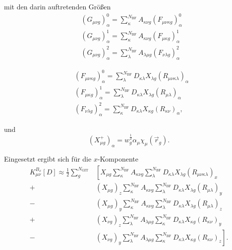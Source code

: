 	mit den darin auftretenden Größen
	\begin{equation}
	\begin{aligned}
	&(G_{\mu\nu g})_\alpha^0=\sum_\kappa^{N_{\textrm{BF}}}A_{\kappa\nu g}(F_{\mu\nu\kappa g})_\alpha^0\\
	&(G_{\mu\nu g})_\alpha^1=\sum_\kappa^{N_{\textrm{BF}}}A_{\kappa\nu g}(F_{\mu\kappa g})_\alpha^1\\
	&(G_{\mu\nu g})_\alpha^2=\sum_\lambda^{N_{\textrm{BF}}}A_{\lambda\mu g}(F_{\nu\lambda g})_\alpha^2
	\end{aligned}
	\end{equation}	
	
	\begin{equation}
	\begin{aligned}
	&(F_{\mu\nu\kappa g})_\alpha^0=\sum_\lambda^{N_{\textrm{BF}}}D_{\kappa\lambda}X_{\lambda g}(R_{\mu\nu\kappa\lambda})_\alpha\\
	&(F_{\mu\kappa g})_\alpha^1=\sum_\lambda^{N_{\textrm{BF}}}D_{\kappa\lambda}X_{\lambda g}(R_{\mu\lambda})_\alpha\\
	&(F_{\nu\lambda g})_\alpha^2=\sum_\kappa^{N_{\textrm{BF}}}D_{\kappa\lambda}X_{\kappa g}(R_{\kappa\nu})_\alpha,
	\end{aligned}
	\end{equation}
	
	und
	\begin{equation}
	\left(X_{\mu g}^+\right)_\alpha=w_g^{\frac{1}{2}}\alpha_\mu\chi_\mu(\vec{r}_g).
	\end{equation}
	
	Eingesetzt ergibt sich für die $x$-Komponente
	\begin{equation}
	\begin{aligned}
	K_{\mu\nu}^{B_x}[D]\approx\frac{1}{2}\sum_{g}^{N_{\textrm{GIT}}}&\left[X_{\mu g}\sum_\kappa^{N_{\textrm{BF}}}A_{\kappa\nu g}\sum_\lambda^{N_{\textrm{BF}}}D_{\kappa\lambda}X_{\lambda g}(R_{\mu\nu\kappa\lambda})_x\right.\\
	+&\left(X_{\mu g}\right)_z\sum_\kappa^{N_{\textrm{BF}}}A_{\kappa\nu g}\sum_\lambda^{N_{\textrm{BF}}}D_{\kappa\lambda}X_{\lambda g}(R_{\mu\lambda})_y\\
	-&\left(X_{\mu g}\right)_y\sum_\kappa^{N_{\textrm{BF}}}A_{\kappa\nu g}\sum_\lambda^{N_{\textrm{BF}}}D_{\kappa\lambda}X_{\lambda g}(R_{\mu\lambda})_z\\
	+&\left(X_{\nu g}\right)_z\sum_\lambda^{N_{\textrm{BF}}}A_{\lambda\mu g}\sum_\kappa^{N_{\textrm{BF}}}D_{\kappa\lambda}X_{\kappa g}(R_{\kappa\nu})_y\\
	-&\left.\left(X_{\nu g}\right)_y\sum_\lambda^{N_{\textrm{BF}}}A_{\lambda\mu g}\sum_\kappa^{N_{\textrm{BF}}}D_{\kappa\lambda}X_{\kappa g}(R_{\kappa\nu})_z\right].
	\end{aligned}
	\end{equation}

